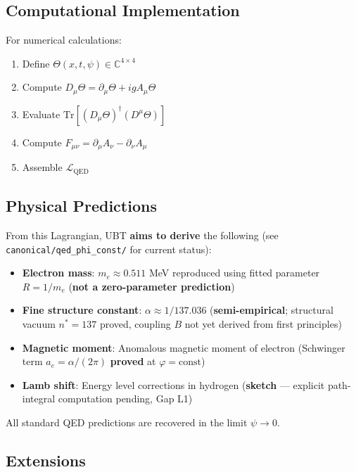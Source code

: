 \subsection{Computational Implementation}

For numerical calculations:

\begin{enumerate}
    \item Define $\Theta(x,t,\psi) \in \mathbb{C}^{4 \times 4}$
    \item Compute $D_\mu\Theta = \partial_\mu\Theta + ig A_\mu\Theta$
    \item Evaluate $\text{Tr}[(D_\mu\Theta)^\dagger(D^\mu\Theta)]$
    \item Compute $F_{\mu\nu} = \partial_\mu A_\nu - \partial_\nu A_\mu$
    \item Assemble $\mathcal{L}_{\text{QED}}$
\end{enumerate}

\subsection{Physical Predictions}

From this Lagrangian, UBT \textbf{aims to derive} the following
(see \texttt{canonical/qed\_phi\_const/} for current status):

\begin{itemize}
    \item \textbf{Electron mass}: $m_e \approx 0.511$ MeV reproduced using
      fitted parameter $R = 1/m_e$ (\textbf{not a zero-parameter prediction})
    \item \textbf{Fine structure constant}: $\alpha \approx 1/137.036$
      (\textbf{semi-empirical}; structural vacuum $n^*=137$ proved,
      coupling $B$ not yet derived from first principles)
    \item \textbf{Magnetic moment}: Anomalous magnetic moment of electron
      (Schwinger term $a_e = \alpha/(2\pi)$ \textbf{proved} at $\varphi=\text{const}$)
    \item \textbf{Lamb shift}: Energy level corrections in hydrogen
      (\textbf{sketch} — explicit path-integral computation pending, Gap L1)
\end{itemize}

All standard QED predictions are recovered in the limit $\psi \to 0$.

\subsection{Extensions}

